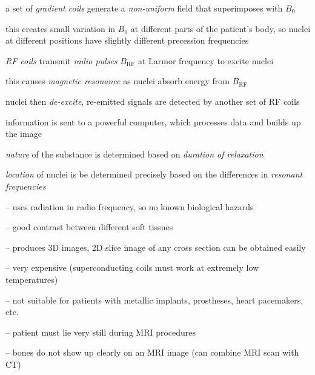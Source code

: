 a set of \emph{gradient coils} generate a \emph{non-uniform} field that superimposes with $B_0$

this creates small variation in $B_0$ at different parts of the patient's body, so nuclei at different positions have slightly different precession frequencies

\emph{RF coils} transmit \emph{radio pulses} $B_\text{RF}$ at Larmor frequency to excite nuclei

this causes \emph{magnetic resonance} as nuclei absorb energy from $B_\text{RF}$

nuclei then \emph{de-excite}, re-emitted signals are detected by another set of RF coils

information is sent to a powerful computer, which processes data and builds up the image

\emph{nature} of the substance is determined based on \emph{duration of relaxation}

\emph{location} of nuclei is be determined precisely based on the differences in \emph{resonant frequencies}


\begin{compactitem}
	\item[--] uses radiation in radio frequency, so no known biological hazards
	
	\item[--] good contrast between different soft tissues
	
	\item[--] produces 3D images, 2D slice image of any cross section can be obtained easily
\end{compactitem}


\begin{compactitem}
	\item[--] very expensive (superconducting coils must work at extremely low temperatures)
	
	\item[--] not suitable for patients with metallic implants, prostheses, heart pacemakers, etc.
	
	\item[--] patient must lie very still during MRI procedures
	
	\item[--] bones do not show up clearly on an MRI image (can combine MRI scan with CT)
	
\end{compactitem}

